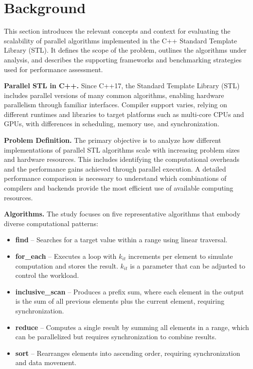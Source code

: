 \documentclass[sigconf]{acmart}
\newcommand{\mypar}[1]{{\bf #1.}}
\begin{document}
\section{Background}\label{sec:background}
This section introduces the relevant concepts and context for evaluating the
scalability of parallel algorithms implemented in the C++ Standard Template
Library (STL). It defines the scope of the problem, outlines the algorithms
under analysis, and describes the supporting frameworks and benchmarking
strategies used for performance assessment.

\mypar{Parallel STL in C++} Since C++17, the Standard Template Library (STL) includes parallel versions  
of many common algorithms, enabling hardware parallelism through  
familiar interfaces. Compiler support varies, relying on different  
runtimes and libraries to target platforms such as multi-core CPUs  
and GPUs, with differences in scheduling, memory use, and synchronization.  

\mypar{Problem Definition} The primary objective is to analyze how different implementations
of parallel STL algorithms scale with increasing problem sizes and hardware resources.
This includes identifying the computational overheads and the performance gains achieved
through parallel execution. A detailed performance comparison is necessary to understand
which combinations of compilers and backends provide the most efficient use of available
computing resources.

\mypar{Algorithms} The study focuses on five representative algorithms that embody diverse computational patterns:
\begin{itemize}
  \item \textbf{find} – Searches for a target value within a range using linear traversal.
  \item \textbf{for\_each} – Executes a loop with $k_{it}$ increments per element to simulate computation and stores the result.
        $k_{it}$ is a parameter that can be adjusted to control the workload.
  \item \textbf{inclusive\_scan} – Produces a prefix sum, where each element in the output is the sum of all previous elements
        plus the current element, requiring synchronization.
  \item \textbf{reduce} – Computes a single result by summing all elements in a range, which can be parallelized
        but requires synchronization to combine results.
  \item \textbf{sort} – Rearranges elements into ascending order, requiring synchronization and data movement.
\end{itemize}
\end{document}
